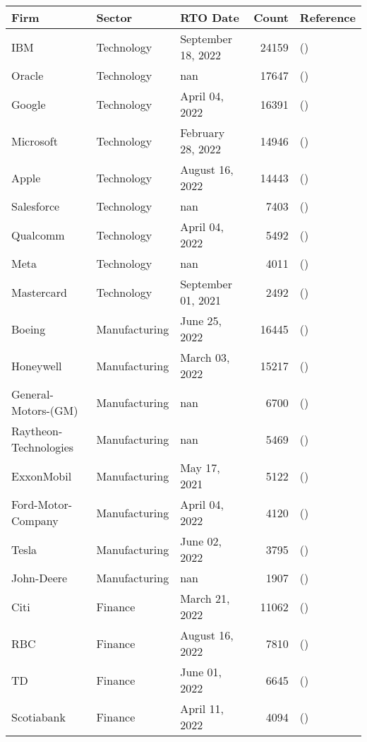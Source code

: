\begin{tabular}{lllrl}
\toprule
Firm & Sector & RTO Date & Count & Reference \\
\midrule
IBM & Technology & September 18, 2022 & 24159 & (\cite{ibm_rto_policy}) \\
Oracle & Technology & nan & 17647 & (\cite{oracle_rto_policy}) \\
Google & Technology & April 04, 2022 & 16391 & (\cite{google_rto_policy}) \\
Microsoft & Technology & February 28, 2022 & 14946 & (\cite{microsoft_rto_policy}) \\
Apple & Technology & August 16, 2022 & 14443 & (\cite{apple_rto_policy}) \\
Salesforce & Technology & nan & 7403 & (\cite{salesforce_rto_policy}) \\
Qualcomm & Technology & April 04, 2022 & 5492 & (\cite{qualcomm_rto_policy}) \\
Meta & Technology & nan & 4011 & (\cite{meta_rto_policy}) \\
Mastercard & Technology & September 01, 2021 & 2492 & (\cite{mastercard_rto_policy}) \\
Boeing & Manufacturing & June 25, 2022 & 16445 & (\cite{boeing_rto_policy}) \\
Honeywell & Manufacturing & March 03, 2022 & 15217 & (\cite{honeywell_rto_policy}) \\
General-Motors-(GM) & Manufacturing & nan & 6700 & (\cite{general_motors_gm_rto_policy}) \\
Raytheon-Technologies & Manufacturing & nan & 5469 & (\cite{raytheon_technologies_rto_policy}) \\
ExxonMobil & Manufacturing & May 17, 2021 & 5122 & (\cite{exxonmobil_rto_policy}) \\
Ford-Motor-Company & Manufacturing & April 04, 2022 & 4120 & (\cite{ford_motor_company_rto_policy}) \\
Tesla & Manufacturing & June 02, 2022 & 3795 & (\cite{tesla_rto_policy}) \\
John-Deere & Manufacturing & nan & 1907 & (\cite{john_deere_rto_policy}) \\
Citi & Finance & March 21, 2022 & 11062 & (\cite{citi_rto_policy}) \\
RBC & Finance & August 16, 2022 & 7810 & (\cite{rbc_rto_policy}) \\
TD & Finance & June 01, 2022 & 6645 & (\cite{td_rto_policy}) \\
Scotiabank & Finance & April 11, 2022 & 4094 & (\cite{scotiabank_rto_policy}) \\

\end{tabular}
